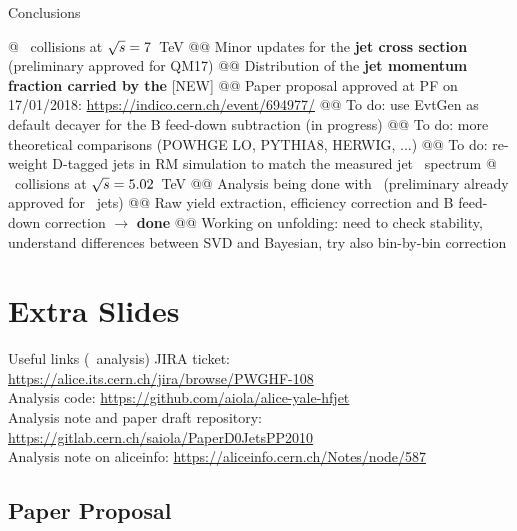 \documentclass[xcolor={usenames,dvipsnames}, aspectratio=169]{beamer}
\begin{document}
\begin{frame}[fragile]{Conclusions}
\footnotesize
\begin{easylist}[itemize]
@ \pp\ collisions at $\sqrt{s}=7$~TeV
@@ Minor updates for the \textbf{jet cross section} (preliminary approved for QM17)
@@ Distribution of the \textbf{jet momentum fraction carried by the \Dzero} \alert{[NEW]}
@@ Paper proposal approved at PF on 17/01/2018: \url{https://indico.cern.ch/event/694977/} 
@@ To do: use EvtGen as default decayer for the B feed-down subtraction (in progress)
@@ To do: more theoretical comparisons (POWHGE LO, PYTHIA8, HERWIG, ...)
@@ To do: re-weight D-tagged jets in RM simulation to match the measured jet \pt\ spectrum
@ \pPb\ collisions at $\sqrt{s}=5.02$~TeV
@@ Analysis being done with \Dzero\ (preliminary already approved for \Dstar\ jets)
@@ Raw yield extraction, efficiency correction and B feed-down correction $\rightarrow$ \textbf{done}
@@ Working on unfolding: need to check stability, understand differences between SVD and Bayesian, try also bin-by-bin correction
\end{easylist}
\end{frame}

\appendix

\section{Extra Slides}

\begin{frame}{Useful links (\pp\ analysis)}
JIRA ticket: \url{https://alice.its.cern.ch/jira/browse/PWGHF-108}\\
\vspace{10pt}
Analysis code: \url{https://github.com/aiola/alice-yale-hfjet}\\
\vspace{10pt}
Analysis note and paper draft repository: \url{https://gitlab.cern.ch/saiola/PaperD0JetsPP2010}\\
\vspace{10pt}
Analysis note on aliceinfo: \url{https://aliceinfo.cern.ch/Notes/node/587}
\end{frame}

\subsection{Paper Proposal}
\end{document}
